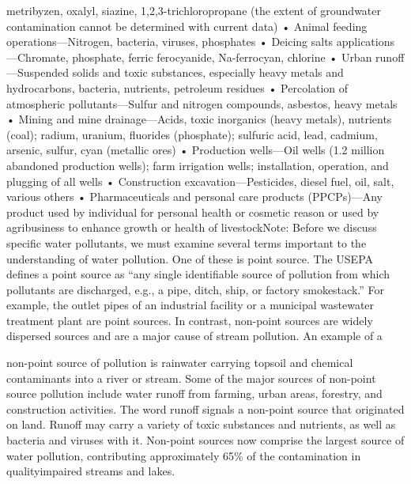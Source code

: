 \documentclass{article}
\begin{document}
metribyzen, oxalyl, siazine, 1,2,3-trichloropropane (the extent of
groundwater contamination cannot be determined with current data) •
Animal feeding operations---Nitrogen, bacteria, viruses, phosphates •
Deicing salts applications---Chromate, phosphate, ferric ferocyanide,
Na-ferrocyan, chlorine • Urban runoff---Suspended solids and toxic
substances, especially heavy metals and hydrocarbons, bacteria,
nutrients, petroleum residues • Percolation of atmospheric
pollutants---Sulfur and nitrogen compounds, asbestos, heavy metals •
Mining and mine drainage---Acids, toxic inorganics (heavy metals),
nutrients (coal); radium, uranium, fluorides (phosphate); sulfuric acid,
lead, cadmium, arsenic, sulfur, cyan (metallic ores) • Production
wells---Oil wells (1.2 million abandoned production wells); farm
irrigation wells; installation, operation, and plugging of all wells •
Construction excavation---Pesticides, diesel fuel, oil, salt, various
others • Pharmaceuticals and personal care products (PPCPs)---Any
product used by individual for personal health or cosmetic reason or
used by agribusiness to enhance growth or health of livestockNote:
Before we discuss specific water pollutants, we must examine several
terms important to the understanding of water pollution. One of these is
point source. The USEPA defines a point source as ``any single
identifiable source of pollution from which pollutants are discharged,
e.g., a pipe, ditch, ship, or factory smokestack.'' For example, the
outlet pipes of an industrial facility or a municipal wastewater
treatment plant are point sources. In contrast, non-point sources are
widely dispersed sources and are a major cause of stream pollution. An
example of a

non-point source of pollution is rainwater carrying topsoil and chemical
contaminants into a river or stream. Some of the major sources of
non-point source pollution include water runoff from farming, urban
areas, forestry, and construction activities. The word runoff signals a
non-point source that originated on land. Runoff may carry a variety of
toxic substances and nutrients, as well as bacteria and viruses with it.
Non-point sources now comprise the largest source of water pollution,
contributing approximately 65\% of the contamination in qualityimpaired
streams and lakes.
\end{document}
